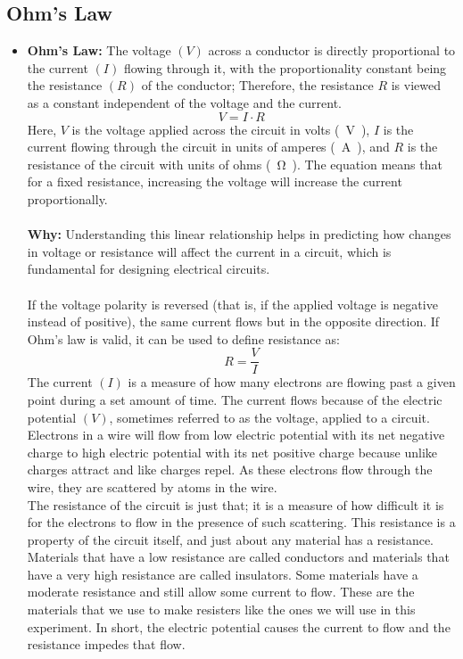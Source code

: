 \documentclass[11pt]{article}
\begin{document}
    \subsection{Ohm's Law}
        \begin{itemize}
            \item \textbf{Ohm's Law:} The voltage $(V)$ across a conductor is directly proportional to the current $(I)$ flowing through it, with the proportionality constant being the resistance $(R)$ of the conductor; Therefore, the resistance $R$ is viewed as a constant independent of the voltage and the current.\\
                $$
                V = I\cdotp R
                $$
                Here, $V$ is the voltage applied across the circuit in volts \si{(\volt)}, $I$ is the current flowing through the circuit in units of amperes \si{(\ampere)}, and $R$ is the resistance of the circuit with units of ohms \si{(\ohm)}.
                The equation means that for a fixed resistance, increasing the voltage will increase the current proportionally.\\
                \\
                \textbf{Why:} Understanding this linear relationship helps in predicting how changes in voltage or resistance will affect the current in a circuit, which is fundamental for designing electrical circuits.\\
                \\
                If the voltage polarity is reversed (that is, if the applied voltage is negative instead of positive), the same current flows but in the opposite direction.
                If Ohm’s law is valid, it can be used to define resistance as:\\
                $$
                R = \frac{V}{I}
                $$
                The current $(I)$ is a measure of how many electrons are flowing past a given point during a set amount of time.
                The current flows because of the electric potential $(V)$, sometimes referred to as the voltage, applied to a circuit.
                Electrons in a wire will flow from low electric potential with its net negative charge to high electric potential with its net positive charge because unlike charges attract and like charges repel.
                As these electrons flow through the wire, they are scattered by atoms in the wire.\\
                The resistance of the circuit is just that; it is a measure of how difficult it is for the electrons to flow in the presence of such scattering.
                This resistance is a property of the circuit itself, and just about any material has a resistance.
                Materials that have a low resistance are called conductors and materials that have a very high resistance are called insulators.
                Some materials have a moderate resistance and still allow some current to flow.
                These are the materials that we use to make resisters like the ones we will use in this experiment.
                In short, the electric potential causes the current to flow and the resistance impedes that flow.
        \end{itemize}
\end{document}
